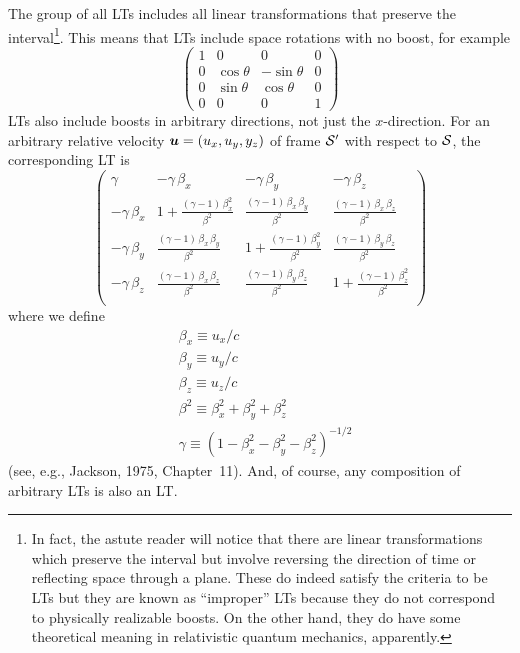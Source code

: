 The group of all LTs includes all linear transformations that preserve
the interval\footnote{In fact, the astute reader will notice that
there are linear transformations which preserve the interval but
involve reversing the direction of time or reflecting space through a
plane.  These do indeed satisfy the criteria to be LTs but they are
known as ``improper'' LTs because they do not correspond to physically
realizable boosts.  On the other hand, they do have some theoretical
meaning in relativistic quantum mechanics, apparently.}.  This means
that LTs include space rotations with no boost, for example
\begin{equation}
\left(\begin{array}{cccc}
1 & 0 & 0 & 0 \\
0 & \cos\theta & -\sin\theta & 0 \\
0 & \sin\theta & \cos\theta & 0 \\
0 & 0 & 0 & 1
\end{array}\right)
\end{equation}
LTs also include boosts in arbitrary directions, not just the
$x$-direction.  For an arbitrary relative velocity
$\mbox{\boldmath $u$}=(u_x,u_y,y_z)$ of frame $\cal S'$ with respect to $\cal S$,
the corresponding LT is
\begin{equation}
\left(\begin{array}{cccc}
\gamma           & -\gamma\,\beta_x & -\gamma\,\beta_y & -\gamma\,\beta_z \\
-\gamma\,\beta_x
  & 1+\frac{(\gamma-1)\,\beta_x^2}{\beta^2}
  & \frac{(\gamma-1)\,\beta_x\,\beta_y}{\beta^2}
  & \frac{(\gamma-1)\,\beta_x\,\beta_z}{\beta^2} \\
-\gamma\,\beta_y
  & \frac{(\gamma-1)\,\beta_x\,\beta_y}{\beta^2}
  & 1+\frac{(\gamma-1)\,\beta_y^2}{\beta^2}
  & \frac{(\gamma-1)\,\beta_y\,\beta_z}{\beta^2} \\
-\gamma\,\beta_z
  & \frac{(\gamma-1)\,\beta_x\,\beta_z}{\beta^2}
  & \frac{(\gamma-1)\,\beta_y\,\beta_z}{\beta^2}
  & 1+\frac{(\gamma-1)\,\beta_z^2}{\beta^2} \\
\end{array}\right)
\end{equation}
where we define
\begin{eqnarray}
& \beta_x \equiv u_x/c \nonumber\\
& \beta_y \equiv u_y/c \nonumber\\
& \beta_z \equiv u_z/c \nonumber\\
& \beta^2 \equiv \beta_x^2 + \beta_y^2 + \beta_z^2 \nonumber\\
& \gamma \equiv (1-\beta_x^2-\beta_y^2-\beta_z^2)^{-1/2}
\end{eqnarray}
(see, e.g., Jackson, 1975, Chapter~11).  And, of course, any
composition of arbitrary LTs is also an LT.

